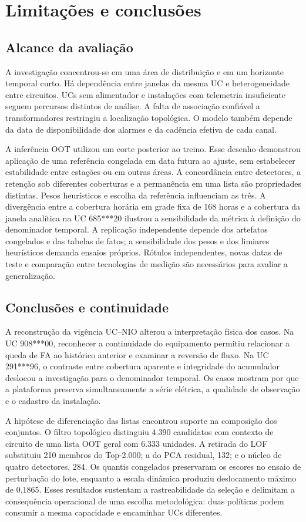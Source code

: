 \chapter{Limitações e conclusões}
\section{Alcance da avaliação}
A investigação concentrou-se em uma área de distribuição e em um horizonte temporal curto. Há dependência entre janelas da mesma UC e heterogeneidade entre circuitos. UCs sem alimentador e instalações com telemetria insuficiente seguem percursos distintos de análise. A falta de associação confiável a transformadores restringiu a localização topológica. O modelo também depende da data de disponibilidade dos alarmes e da cadência efetiva de cada canal.

A inferência OOT utilizou um corte posterior ao treino. Esse desenho demonstrou aplicação de uma referência congelada em data futura ao ajuste, sem estabelecer estabilidade entre estações ou em outras áreas. A concordância entre detectores, a retenção sob diferentes coberturas e a permanência em uma lista são propriedades distintas. Pesos heurísticos e escolha da referência influenciam as três. A divergência entre a cobertura horária em grade fixa de 168 horas e a cobertura da janela analítica na UC 685***20 ilustrou a sensibilidade da métrica à definição do denominador temporal. A replicação independente depende dos artefatos congelados e das tabelas de fatos; a sensibilidade dos pesos e dos limiares heurísticos demanda ensaios próprios. Rótulos independentes, novas datas de teste e comparação entre tecnologias de medição são necessários para avaliar a generalização.

\section{Conclusões e continuidade}
A reconstrução da vigência UC–NIO alterou a interpretação física dos casos. Na UC 908***00, reconhecer a continuidade do equipamento permitiu relacionar a queda de FA ao histórico anterior e examinar a reversão de fluxo. Na UC 291***96, o contraste entre cobertura aparente e integridade do acumulador deslocou a investigação para o denominador temporal. Os casos mostram por que a plataforma preserva simultaneamente a série elétrica, a qualidade de observação e o cadastro da instalação.

A hipótese de diferenciação das listas encontrou suporte na composição dos conjuntos. O filtro topológico distinguiu 4.390 candidatos com contexto de circuito de uma lista OOT geral com 6.333 unidades. A retirada do LOF substituiu 210 membros do Top-2.000; a do PCA residual, 132; e o núcleo de quatro detectores, 284. Os quantis congelados preservaram os escores no ensaio de perturbação do lote, enquanto a escala dinâmica produziu deslocamento máximo de 0,1865. Esses resultados sustentam a rastreabilidade da seleção e delimitam a consequência operacional de uma escolha metodológica: duas políticas podem consumir a mesma capacidade e encaminhar UCs diferentes.

